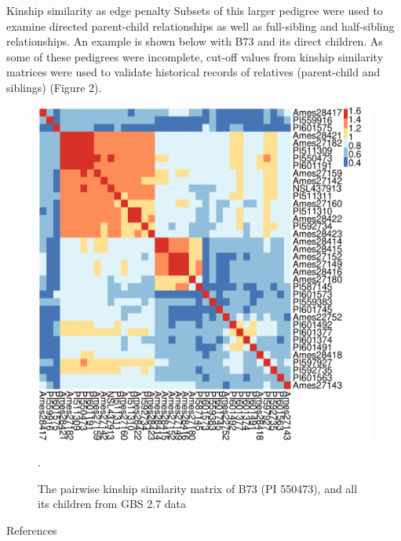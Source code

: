 \documentclass[final]{beamer}
\newlength{\onecolwid}
\begin{document}
\begin{frame}[t]
\begin{columns}[t]
\begin{column}{\onecolwid}
\begin{block}{Kinship similarity as edge penalty}
Subsets of this larger pedigree were used to examine directed parent-child relationships as well as full-sibling and half-sibling relationships. An example is shown below with B73 and its direct children. As some of these pedigrees were incomplete, cut-off values from kinship similarity matrices were used to validate historical records of relatives (parent-child and siblings) (Figure 2). 
\begin{figure}
\includegraphics[width=1.0\linewidth]{Rplot02.pdf}
\caption{The pairwise kinship similarity matrix of B73 (PI 550473), and all its children from GBS 2.7 data}.
\end{figure}
\end{block}


\begin{block}{References}

\nocite{*} %
\small{
\vspace{0.08in}}


\end{block}
\end{column}
\end{columns}
\end{frame}
\end{document}
